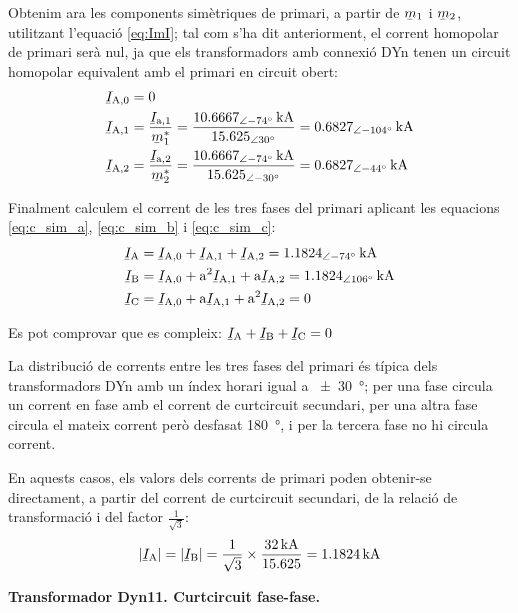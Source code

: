 \begin{exemple}
    Obtenim ara les components simètriques de primari, a partir de $\cmplx{m}_1$ i $\cmplx{m}_2$, utilitzant l'equació \eqref{eq:ImI}; tal com s'ha dit anteriorment, el corrent homopolar de primari serà nul, ja que els transformadors amb connexió DYn tenen un circuit homopolar equivalent amb el primari en circuit obert:
    \begin{align*}
        \cmplx{I}\ped{A,0} &= 0 \\
        \cmplx{I}\ped{A,1} &= \frac{\cmplx{I}\ped{a,1}}{\cmplx{m}^*_1} = \frac{\qtypd{10,6667}{-74}{kA}}{\numpd{15,625}{30}} =  \qtypd{0,6827}{-104}{kA} \\
        \cmplx{I}\ped{A,2} &= \frac{\cmplx{I}\ped{a,2}}{\cmplx{m}^*_2} = \frac{\qtypd{10,6667}{-74}{kA}}{\numpd{15,625}{-30}} = \qtypd{0,6827}{-44}{kA}
    \end{align*}

    Finalment calculem el corrent de les tres fases del primari aplicant les equacions \eqref{eq:c_sim_a}, \eqref{eq:c_sim_b} i \eqref{eq:c_sim_c}:
     \begin{align*}
        \cmplx{I}\ped{A} &= \cmplx{I}\ped{A,0} + \cmplx{I}\ped{A,1} + \cmplx{I}\ped{A,2} = \qtypd{1,1824}{-74}{kA} \\
        \cmplx{I}\ped{B} &= \cmplx{I}\ped{A,0} + \au^2 \cmplx{I}\ped{A,1} + \au \cmplx{I}\ped{A,2} = \qtypd{1,1824}{106}{kA} \\
        \cmplx{I}\ped{C} &= \cmplx{I}\ped{A,0} + \au \cmplx{I}\ped{A,1} + \au^2 \cmplx{I}\ped{A,2} = 0
    \end{align*}

    Es pot comprovar que es compleix: $\cmplx{I}\ped{A} + \cmplx{I}\ped{B} + \cmplx{I}\ped{C} = 0$

    La distribució de corrents entre les tres fases del primari és típica dels transformadors DYn amb un índex horari igual a \qty{+-30}{\degree}; per una fase circula un corrent en fase amb el corrent de curtcircuit secundari, per una altra fase circula el mateix corrent però desfasat \qty{180}{\degree}, i per la tercera fase no hi circula corrent.

    En aquests casos, els valors dels corrents de primari poden obtenir-se directament, a partir del corrent de curtcircuit secundari, de la relació de transformació i del factor $\frac{1}{\sqrt{3}}$:
    \[
        |\cmplx{I}\ped{A}| = |\cmplx{I}\ped{B}| = \frac{1}{\sqrt{3}} \times \frac{\qty{32}{kA}}{\num{15,625}} = \qty{1,1824}{kA}
    \]

    \textbf{ Transformador Dyn11. Curtcircuit fase-fase.}


\end{exemple}
